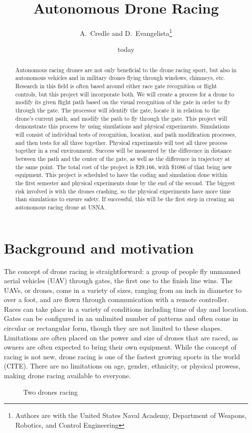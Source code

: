 \documentclass[onecolumn,10pt]{IEEEtran}
\title{Autonomous Drone Racing}
\author{A.~Credle and D.~Evangelista\thanks{Authors are with the United States Naval Academy, Department of Weapons, Robotics, and Control Engineering}}
\date{today}
\begin{document}
\maketitle

\begin{abstract}
Autonomous racing drones are not only beneficial to the drone racing sport, but also in autonomous vehicles and in military drones flying through windows, chimneys, etc. Research in this field is often based around either race gate recognition or flight controls, but this project will incorporate both. We will create a process for a drone to modify its given flight path based on the visual recognition of the gate in order to fly through the gate. The processor will identify the gate, locate it in relation to the drone’s current path, and modify the path to fly through the gate. This project will demonstrate this process by using simulations and physical experiments. Simulations will consist of individual tests of recognition, location, and path modification processes, and then tests for all three together. Physical experiments will test all three process together in a real environment. Success will be measured by the difference in distance between the path and the center of the gate, as well as the difference in trajectory at the same point. The total cost of the project is \$29,166, with \$1086 of that being new equipment. This project is scheduled to have the coding and simulation done within the first semester and physical experiments done by the end of the second. The biggest risk involved is with the drones crashing, so the physical experiments have more time than simulations to ensure safety. If successful, this will be the first step in creating an autonomous racing drone at USNA.
\end{abstract}

\section{Background and motivation}
The concept of drone racing is straightforward: a group of people fly unmanned aerial vehicles (UAV) through gates, the first one to the finish line wins. The UAVs, or drones, come in a variety of sizes, ranging from an inch in diameter to over a foot, and are flown through communication with a remote controller. Races can take place in a variety of conditions including time of day and location. Gates can be configured in an unlimited number of patterns and often come in circular or rectangular form, though they are not limited to these shapes. Limitations are often placed on the power and size of drones that are raced, as owners are often expected to bring their own equipment. While the concept of racing is not new, drone racing is one of the fastest growing sports in the world (CITE). There are no limitations on age, gender, ethnicity, or physical prowess, making drone racing available to everyone.
\begin{figure}
\caption{Two drones racing}
\label{fig1}
\end{figure}
\end{document}
